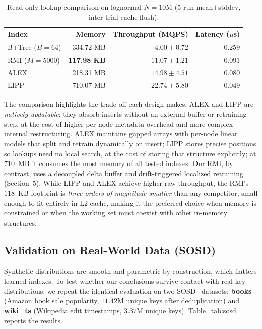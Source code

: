 \documentclass[sigconf, nonacm]{acmart}
\begin{document}
\begin{table}[t]
\centering
\caption{Read-only lookup comparison on lognormal $N{=}10$M (5-run mean$\pm$stddev, inter-trial cache flush).}
\label{tab:baselines}
\begin{tabular}{lrrr}
\toprule
\textbf{Index} & \textbf{Memory} & \textbf{Throughput (MQPS)} & \textbf{Latency ($\mu$s)} \\
\midrule
B+Tree ($B{=}64$) & 334.72 MB & $4.00 \pm 0.72$ & $0.259$ \\
RMI ($M{=}5000$)   & \textbf{117.98 KB} & $11.07 \pm 1.21$ & $0.091$ \\
ALEX~\cite{ding2020alex}   & 218.31 MB & $14.98 \pm 4.51$ & $0.080$ \\
LIPP~\cite{wu2021lipp}     & 710.07 MB & $\mathbf{22.74 \pm 5.80}$ & $\mathbf{0.049}$ \\
\bottomrule
\end{tabular}
\end{table}

\medskip

The comparison highlights the trade-off each design makes. ALEX and LIPP are \textit{natively updatable}: they absorb inserts without an external buffer or retraining step, at the cost of higher per-node metadata overhead and more complex internal restructuring. ALEX maintains gapped arrays with per-node linear models that split and retrain dynamically on insert; LIPP stores precise positions so lookups need no local search, at the cost of storing that structure explicitly; at $710$~MB it consumes the most memory of all tested indexes. Our RMI, by contrast, uses a decoupled delta buffer and drift-triggered localized retraining (Section~5). While LIPP and ALEX achieve higher raw throughput, the RMI's $118$~KB footprint is \textit{three orders of magnitude smaller} than any competitor, small enough to fit entirely in L2 cache, making it the preferred choice when memory is constrained or when the working set must coexist with other in-memory structures.

\subsection{Validation on Real-World Data (SOSD)}
Synthetic distributions are smooth and parametric by construction, which flatters learned indexes. To test whether our conclusions survive contact with real key distributions, we repeat the identical evaluation on two SOSD~\cite{marcus2020benchmarking} datasets: \textbf{books} (Amazon book sale popularity, $11.42$M unique keys after deduplication) and \textbf{wiki\_ts} (Wikipedia edit timestamps, $3.37$M unique keys). Table~\ref{tab:sosd} reports the results.
\end{document}
